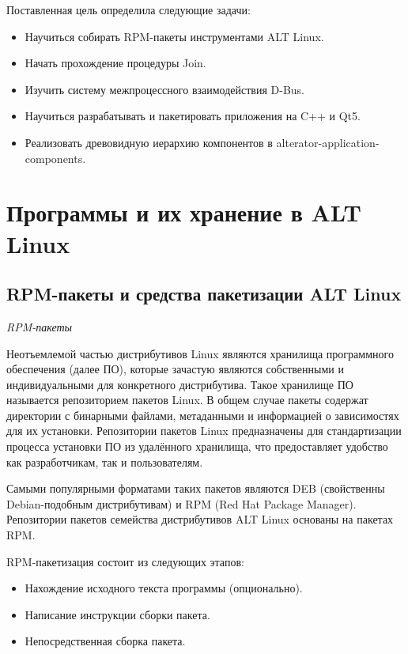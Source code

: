 \documentclass[bachelor, och, pract]{SCWorks}
\begin{document}
Поставленная цель определила следующие задачи:
\begin{itemize}
    \item Научиться собирать RPM-пакеты инструментами ALT Linux.
    \item Начать прохождение процедуры Join.
    \item Изучить систему межпроцессного взаимодействия D-Bus.
    \item Научиться разрабатывать и пакетировать приложения на C++ и Qt5.
    \item Реализовать древовидную иерархию компонентов в alterator-application-components.
\end{itemize}

\section{Программы и их хранение в ALT Linux} %

\subsection{RPM-пакеты и средства пакетизации ALT Linux}

\textit{RPM-пакеты}

Неотъемлемой частью дистрибутивов Linux являются хранилища программного обеспечения (далее ПО), которые зачастую являются собственными и индивидуальными для конкретного дистрибутива.
Такое хранилище ПО называется репозиторием пакетов Linux.
В общем случае пакеты содержат директории с бинарными файлами, метаданными и информацией о зависимостях для их установки.
Репозитории пакетов Linux предназначены для стандартизации процесса установки ПО из удалённого хранилища, что предоставляет удобство как разработчикам, так и пользователям.

Самыми популярными форматами таких пакетов являются DEB (свойственны Debian-подобным дистрибутивам) и RPM (Red Hat Package Manager).
Репозитории пакетов семейства дистрибутивов ALT Linux основаны на пакетах RPM.

RPM-пакетизация состоит из следующих этапов:
\begin{itemize}                                                                           
    \item Нахождение исходного текста программы (опционально).                           
    \item Написание инструкции сборки пакета.                                              
    \item Непосредственная сборка пакета.                            
\end{itemize}
\end{document}
